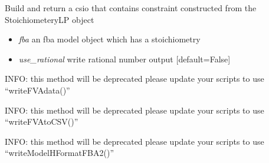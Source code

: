 \documentclass[a4paper,11pt,english]{sphinxmanual}
\begin{document}
\begin{fulllineitems}
\label{modules_doc:cbmpy.CBWrite.BuildLPUserConstraints}
Build and return a csio that contains constraint constructed from
the StoichiometeryLP object
\begin{itemize}
\item {} 
\emph{fba} an fba model object which has a stoichiometry

\item {} 
\emph{use\_rational} write rational number output {[}default=False{]}

\end{itemize}

\end{fulllineitems}


\begin{fulllineitems}
\label{modules_doc:cbmpy.CBWrite.WriteFVAdata}
INFO: this method will be deprecated please update your scripts to use ``writeFVAdata()''

\end{fulllineitems}


\begin{fulllineitems}
\label{modules_doc:cbmpy.CBWrite.WriteFVAtoCSV}
INFO: this method will be deprecated please update your scripts to use ``writeFVAtoCSV()''

\end{fulllineitems}


\begin{fulllineitems}
\label{modules_doc:cbmpy.CBWrite.WriteModelHFormatFBA}
INFO: this method will be deprecated please update your scripts to use ``writeModelHFormatFBA2()''

\end{fulllineitems}
\end{document}

